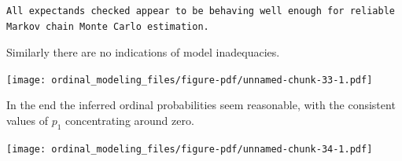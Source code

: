 \documentclass[
  letterpaper,
  DIV=11,
  numbers=noendperiod]{scrartcl}
\newenvironment{Shaded}{\begin{snugshade}}{\end{snugshade}}
\newcommand{\AttributeTok}[1]{\textcolor[rgb]{0.40,0.45,0.13}{#1}}
\newcommand{\ControlFlowTok}[1]{\textcolor[rgb]{0.00,0.23,0.31}{#1}}
\newcommand{\DecValTok}[1]{\textcolor[rgb]{0.68,0.00,0.00}{#1}}
\newcommand{\FloatTok}[1]{\textcolor[rgb]{0.68,0.00,0.00}{#1}}
\newcommand{\FunctionTok}[1]{\textcolor[rgb]{0.28,0.35,0.67}{#1}}
\newcommand{\NormalTok}[1]{\textcolor[rgb]{0.00,0.23,0.31}{#1}}
\newcommand{\OtherTok}[1]{\textcolor[rgb]{0.00,0.23,0.31}{#1}}
\newcommand{\SpecialCharTok}[1]{\textcolor[rgb]{0.37,0.37,0.37}{#1}}
\newcommand{\StringTok}[1]{\textcolor[rgb]{0.13,0.47,0.30}{#1}}
\begin{document}
\begin{verbatim}
All expectands checked appear to be behaving well enough for reliable
Markov chain Monte Carlo estimation.
\end{verbatim}

Similarly there are no indications of model inadequacies.

\begin{Shaded}
\end{Shaded}

\texttt{[image: ordinal\_modeling\_files/figure-pdf/unnamed-chunk-33-1.pdf]}

In the end the inferred ordinal probabilities seem reasonable, with the
consistent values of \(p_{1}\) concentrating around zero.

\begin{Shaded}
\end{Shaded}

\texttt{[image: ordinal\_modeling\_files/figure-pdf/unnamed-chunk-34-1.pdf]}
\end{document}
